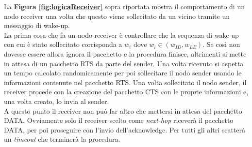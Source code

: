 La \textbf{Figura \ref{fig:logicaReceiver}} sopra riportata mostra il comportamento di un nodo receiver una volta che questo viene sollecitato da un vicino tramite un messaggio di wake-up.\\
La prima cosa che fa un nodo receiver è controllare che la sequenza di wake-up con cui è stato sollecitato corrisponda a \(w_{i}\) dove \(w_{i} \in (w_{ID}, w_{LE})\). Se così non dovesse essere allora ignora il pacchetto e la procedura finisce, altrimenti si mette in attesa di un pacchetto RTS da parte del sender. Una volta ricevuto si aspetta un tempo calcolato randomicamente per poi sollecitare il nodo sender usando le informazioni contenute nel pacchetto RTS. Una volta sollecitato il nodo sender, il receiver procede con la creazione del pacchetto CTS con le proprie informazioni e, una volta creato, lo invia al sender.\\
A questo punto il receiver non può far altro che mettersi in attesa del pacchetto DATA. Ovviamente solo il receiver scelto come \textit{next-hop} riceverà il pacchetto DATA, per poi proseguire con l'invio dell'acknowledge. Per tutti gli altri scatterà un \textit{timeout} che terminerà la procedura.